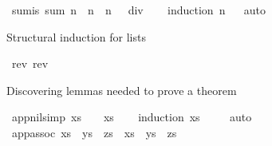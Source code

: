 \begin{isabellebody}
\isanewline
{}\isamarkupfalse%
\ sum{\isacharunderscore}{\kern0pt}is{\isacharcolon}{\kern0pt}\ {\isachardoublequoteopen}sum\ n\ {\isacharequal}{\kern0pt}\ n\ {\isacharasterisk}{\kern0pt}\ {\isacharparenleft}{\kern0pt}n\ {\isacharplus}{\kern0pt}\ {}{\isacharparenright}{\kern0pt}\ div\ {}{\isachardoublequoteclose}\isanewline
%
\isadelimproof
\ \ %
\endisadelimproof
%
\isatagproof
{}\isamarkupfalse%
{\isacharparenleft}{\kern0pt}induction\ n{\isacharparenright}{\kern0pt}\isanewline
\ \ \isamarkupfalse%
{\isacharparenleft}{\kern0pt}auto{\isacharparenright}{\kern0pt}\isanewline
\ \ \isamarkupfalse%
%
\endisatagproof
{\isafoldproof}%
%
\isadelimproof
%
\endisadelimproof
%
\begin{isamarkuptext}%
Structural induction for lists%
\end{isamarkuptext}\isamarkuptrue%
\isamarkupfalse%
\ {\isachardoublequoteopen}rev\ {\isacharparenleft}{\kern0pt}rev\ {\isacharunderscore}{\kern0pt}\ {\isacharparenright}{\kern0pt}{\isachardoublequoteclose}%
\begin{isamarkuptext}%
Discovering lemmas needed to prove a theorem%
\end{isamarkuptext}\isamarkuptrue%
\isamarkupfalse%
\ app{\isacharunderscore}{\kern0pt}nil{\isacharbrackleft}{\kern0pt}simp{\isacharbrackright}{\kern0pt}{\isacharcolon}{\kern0pt}\ {\isachardoublequoteopen}xs\ {\isacharat}{\kern0pt}\ {\isacharbrackleft}{\kern0pt}{\isacharbrackright}{\kern0pt}\ {\isacharequal}{\kern0pt}\ xs{\isachardoublequoteclose}\isanewline
%
\isadelimproof
\ \ %
\endisadelimproof
%
\isatagproof
{}\isamarkupfalse%
\ {\isacharparenleft}{\kern0pt}induction\ xs{\isacharparenright}{\kern0pt}\isanewline
\ \ \ \isamarkupfalse%
\ {\isacharparenleft}{\kern0pt}auto{\isacharparenright}{\kern0pt}\isanewline
\ \ \isamarkupfalse%
%
\endisatagproof
{\isafoldproof}%
%
\isadelimproof
\isanewline
%
\endisadelimproof
\isanewline
{}\isamarkupfalse%
\ app{\isacharunderscore}{\kern0pt}assoc{\isacharcolon}{\kern0pt}\ {\isachardoublequoteopen}{\isacharparenleft}{\kern0pt}xs\ {\isacharat}{\kern0pt}\ ys{\isacharparenright}{\kern0pt}\ {\isacharat}{\kern0pt}\ zs\ {\isacharequal}{\kern0pt}\ xs\ {\isacharat}{\kern0pt}\ {\isacharparenleft}{\kern0pt}ys\ {\isacharat}{\kern0pt}\ zs{\isacharparenright}{\kern0pt}{\isachardoublequoteclose}\isanewline
%
\isadelimproof
\ \ %
\endisadelimproof
%
\isatagproof

\end{isabellebody}
